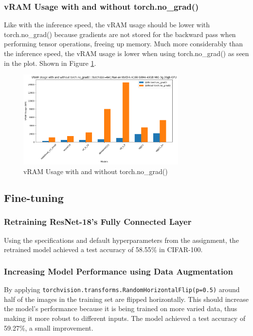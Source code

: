 \documentclass[a4paper]{article}
\begin{document}
\subsubsection{vRAM Usage with and without torch.no\_grad()}
Like with the inference speed, the vRAM usage should be lower with torch.no\_grad() because gradients are not
stored for the backward pass when performing tensor operations, freeing up memory. Much more considerably than the
inference speed, the vRAM usage is lower when using torch.no\_grad() as seen in the plot. Shown in Figure
\ref{fig:VRAM-vs-noGrad}.
\begin{figure}[h]
    \centering
    \includegraphics[width=0.75\textwidth]{"imgs/VRAM-vs-noGrad.png"}
    \caption{vRAM Usage with and without torch.no\_grad()}
    \label{fig:VRAM-vs-noGrad}
\end{figure}
\bigskip

\subsection{Fine-tuning}
\subsubsection{Retraining ResNet-18's Fully Connected Layer}
Using the specifications and default hyperparameters from the assignment, the retrained model achieved a test
accuracy of 58.55\% in CIFAR-100.

\subsubsection{Increasing Model Performance using Data Augmentation}
By applying \texttt{torchvision.transforms.RandomHorizontalFlip(p=0.5)} around half of the images in the training
set are flipped horizontally. This should increase the model's performance because it is being trained on more
varied data, thus making it more robust to different inputs. The model achieved a test accuracy of 59.27\%, a small
improvement.
\end{document}
